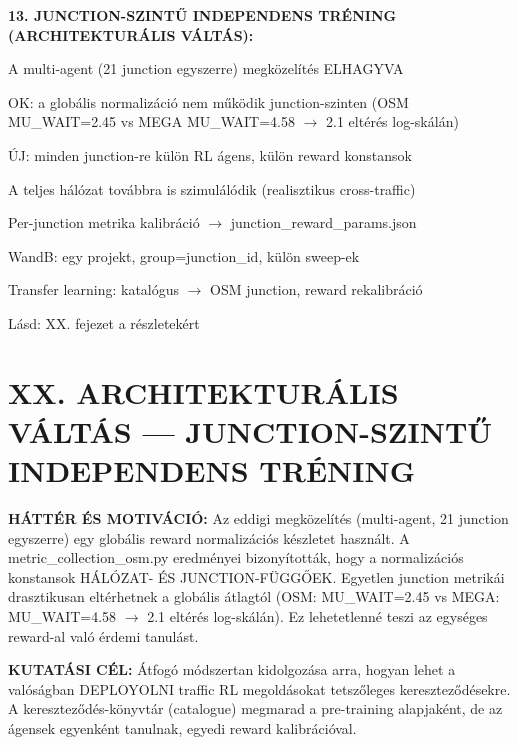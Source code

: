 \documentclass[11pt,a4paper]{article}
\begin{document}
\textbf{13. JUNCTION-SZINTŰ INDEPENDENS TRÉNING (ARCHITEKTURÁLIS VÁLTÁS):}
\par\noindent\hspace*{1em}\textbullet{} A multi-agent (21 junction egyszerre) megközelítés ELHAGYVA
\par\noindent\hspace*{1em}\textbullet{} OK: a globális normalizáció nem működik junction-szinten
(OSM MU\_WAIT=2.45 vs MEGA MU\_WAIT=4.58 $\rightarrow$ 2.1 eltérés log-skálán)
\par\noindent\hspace*{1em}\textbullet{} ÚJ: minden junction-re külön RL ágens, külön reward konstansok
\par\noindent\hspace*{1em}\textbullet{} A teljes hálózat továbbra is szimulálódik (realisztikus cross-traffic)
\par\noindent\hspace*{1em}\textbullet{} Per-junction metrika kalibráció $\rightarrow$ junction\_reward\_params.json
\par\noindent\hspace*{1em}\textbullet{} WandB: egy projekt, group=junction\_id, külön sweep-ek
\par\noindent\hspace*{1em}\textbullet{} Transfer learning: katalógus $\rightarrow$ OSM junction, reward rekalibráció
\par\noindent\hspace*{1em}\textbullet{} Lásd: XX. fejezet a részletekért


\section*{XX. ARCHITEKTURÁLIS VÁLTÁS — JUNCTION-SZINTŰ INDEPENDENS TRÉNING}

\textbf{HÁTTÉR ÉS MOTIVÁCIÓ:}
Az eddigi megközelítés (multi-agent, 21 junction egyszerre) egy globális
reward normalizációs készletet használt. A metric\_collection\_osm.py
eredményei bizonyították, hogy a normalizációs konstansok HÁLÓZAT- ÉS
JUNCTION-FÜGGŐEK. Egyetlen junction metrikái drasztikusan eltérhetnek
a globális átlagtól (OSM: MU\_WAIT=2.45 vs MEGA: MU\_WAIT=4.58 $\rightarrow$ 2.1
eltérés log-skálán). Ez lehetetlenné teszi az egységes reward-al
való érdemi tanulást.

\textbf{KUTATÁSI CÉL:}
Átfogó módszertan kidolgozása arra, hogyan lehet a valóságban
DEPLOYOLNI traffic RL megoldásokat tetszőleges kereszteződésekre.
A kereszteződés-könyvtár (catalogue) megmarad a pre-training
alapjaként, de az ágensek egyenként tanulnak, egyedi reward
kalibrációval.
\end{document}
